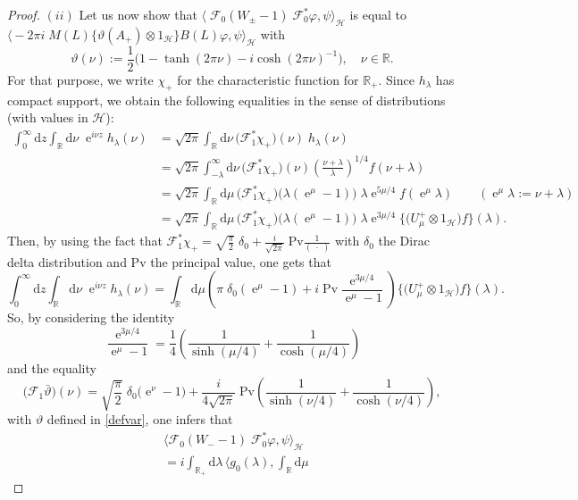 \documentclass{article}
\def\d{\mathrm{d}}
\def\F{\mathscr F}
\def\H{\mathcal H}
\def\R{\mathbb R}
\def\Hrond{\mathscr H}
\def\Pv{\mathrm{Pv}}
\def\e{\mathop{\mathrm{e}}\nolimits}
\begin{document}
\begin{proof}
$(ii)$ Let us now show that 
$
\big\langle\;\!\F_0(W_\pm-1)\;\!\F_0^*\varphi,\psi\big\rangle_{\!\Hrond}
$
is equal to
$
\big\langle-2\pi i\;\!M(L)\big\{\vartheta(A_+)\otimes1_{\H}\big\}B(L)\varphi,
\psi\big\rangle_{\!\Hrond}
$
with 
\begin{equation}\label{defvar}
\vartheta(\nu):=\frac12\big(1-\tanh(2\pi\nu)-i\cosh(2\pi\nu)^{-1}\big),\quad\nu\in\R.
\end{equation}
For that purpose, we write $\chi_+$ for the characteristic function for $\R_+$. Since
$h_\lambda$ has compact support, we obtain the following equalities in the sense of
distributions (with values in $\H$)\;\!:
\begin{align*}
\int_0^\infty\d z\int_\R\d\nu\;\!\e^{i\nu z}h_\lambda(\nu)
&=\sqrt{2\pi}\int_\R\d\nu\,\big(\F_1^*\chi_+\big)(\nu)\;\!h_\lambda(\nu)\\
&=\sqrt{2\pi}\int_{-\lambda}^\infty\d\nu\,\big(\F_1^*\chi_+\big)(\nu)
\left(\frac{\nu+\lambda}{\lambda}\right)^{1/4}f(\nu+\lambda)\\
&=\sqrt{2\pi}\int_\R\d\mu\,\big(\F_1^*\chi_+\big)\big(\lambda(\e^\mu-1)\big)
\;\!\lambda\e^{5\mu/4}f(\e^\mu\lambda)\qquad(\e^\mu\lambda:=\nu+\lambda)\\
&=\sqrt{2\pi}\int_\R\d\mu\,\big(\F_1^*\chi_+\big)\big(\lambda(\e^\mu-1)\big)
\;\!\lambda\e^{3\mu/4}\big\{\big(U_\mu^+\otimes1_{\H}\big)f\big\}(\lambda).
\end{align*}
Then, by using the fact that
$
\F_1^*\chi_+
=\sqrt{\frac\pi2}\;\!\delta_0+\frac i{\sqrt{2\pi}}\;\!\Pv\frac1{(\;\!\cdot\;\!)}
$
with $\delta_0$ the Dirac delta distribution and $\Pv$ the principal value, one gets
that
$$
\int_0^\infty\d z\int_\R\d\nu\;\!\e^{i\nu z}h_\lambda(\nu)
=\int_\R\d\mu\left(\pi\;\!\delta_0(\e^\mu-1)
+i\;\!\Pv\frac{\e^{3\mu/4}}{\e^\mu-1}\right)
\big\{\big(U_\mu^+\otimes1_{\H}\big)f\big\}(\lambda).
$$
So, by considering the identity
$$
\frac{\e^{3\mu/4}}{\e^\mu-1}
=\frac14\left(\frac1{\sinh(\mu/4)}+\frac1{\cosh(\mu/4)}\right)
$$
and the equality \cite[Table 20.1]{Jef95}
\begin{equation*}
\big(\F_1\bar\vartheta\big)(\nu)
=\sqrt{\frac\pi2}\;\!\delta_0\big(\e^\nu-1\big)
+\frac i{4\sqrt{2\pi}}\;\!\Pv\left(\frac1{\sinh(\nu/4)}+\frac1{\cosh(\nu/4)}\right),
\end{equation*}
with $\vartheta$ defined in \eqref{defvar}, one infers that
\begin{align*}
&\big\langle\F_0(W_--1)\;\!\F_0^*\varphi,\psi\big\rangle_{\!\Hrond}\\
&=i\int_{\R_+}\d\lambda\,\bigg\langle g_0(\lambda),\int_\R\d\mu\,

\end{align*}
\end{proof}
\end{document}
